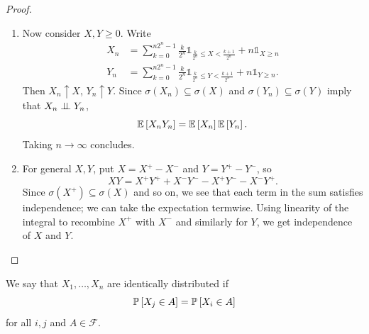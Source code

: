 \begin{proof}
\begin{enumerate}[label=(\roman*)]
			Instead, we should decompose as \[
				X = \sum\limits_{i=1}^{n} a_i \mathds{1}_{X = a_i}, \quad Y = \sum\limits_{j=1}^{m} b_j \mathds{1}_{Y = b_j}
			.\] Then we can actually continue to get
			\begin{align*}
				\E\left[XY\right]  &=  \sum\limits_{i=1}^{n} \sum\limits_{j=1}^{m} a_i b_j \P\left[X = a_i, Y = b_j\right]  \\
				&= \sum\limits_{i=1}^{n} \sum\limits_{j=1}^{m} a_i b_j \P\left[X = a_i\right] \P\left[Y = b_j\right]   \\
				&= \left( \sum\limits_{i=1}^{n} a_i \P\left[X = a_i\right]  \right)\left( \sum\limits_{j=1}^{m} b_j \P\left[Y = b_j\right]  \right) \\
				&= \E\left[X\right] \E\left[Y\right] 
			.\end{align*}
		\item Now consider $X,Y \ge 0$. Write 
			\begin{align*}
				X_n &= \sum\limits_{k=0}^{n2^n - 1} \frac{k}{2^n}\mathds{1}_{\frac{k}{2^n}\le X < \frac{k+1}{2^n}} + n \mathds{1}_{X \ge n} \\
				Y_n &= \sum\limits_{k=0}^{n2^n - 1} \frac{k}{2^n}\mathds{1}_{\frac{k}{2^n}\le Y < \frac{k+1}{2^n}} + n \mathds{1}_{Y \ge n}
			.\end{align*}
			Then $X_n \uparrow X$, $Y_n \uparrow Y$.
			Since $\sigma(X_n) \subseteq \sigma(X)$ and $\sigma(Y_n) \subseteq \sigma(Y)$ imply that $X_n \ind Y_n$, \[
				\E\left[X_n Y_n\right]  = \E\left[X_n\right] \E\left[Y_n\right] 
			.\] Taking $n\to \infty$ concludes.
		\item For general $X,Y$, put $X = X^+ - X^-$ and $Y = Y^+ - Y^-$, so \[
			XY = X^+Y^+ + X^-Y^- - X^+Y^- - X^-Y^+
		.\] Since $\sigma(X^+) \subseteq \sigma(X)$ and so on, we see that each term in the sum satisfies independence; we can take the expectation termwise.
		Using linearity of the integral to recombine $X^+$ with $X^-$ and similarly for $Y$, we get independence of $X$ and $Y$.
	\end{enumerate}
\end{proof}

\begin{definition}
	We say that $X_1,\ldots,X_n$ are identically distributed if \[
		\P\left[X_j \in A\right] = \P\left[X_i \in A\right] 
	\] for all $i,j$ and $A \in \mathscr{F}$.
\end{definition}
